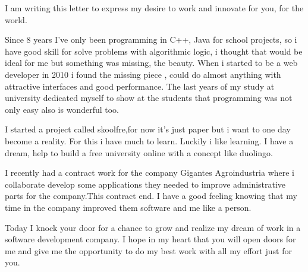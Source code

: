 \documentclass[11pt,a4paper,sans]{moderncv} %
\begin{document}
\makelettertitle %
I am writing this letter to express my desire to work and innovate for you, for the world.


Since 8 years I've only been programming in C++, Java for school projects, so i have good skill for solve problems with  algorithmic logic, i thought that would be ideal for me but something was missing, the beauty.
When i started to be a web developer in 2010 i found the missing piece , could do almost anything  with attractive interfaces and good performance. 
The last years of my study at university dedicated myself to show  at the students that programming was not only easy  also is wonderful too. 

I started a project called skoolfre,for now it's just paper but i want to one day become a reality. For this i have much to learn. Luckily i like  learning. I have a dream, help to build a free university online with  a concept like duolingo.

I recently  had a  contract work for the company Gigantes Agroindustria  where i collaborate  develop some applications they needed to improve administrative parts for the  company.This contract end. I have a good feeling knowing that my time in the company improved  them software and me like a person.

Today I knock  your door for a chance to grow and realize my dream of work in a software development company. I hope in my heart that you will open doors for me and give me the opportunity to do my best work with all my effort just for you.

\makeletterclosing %

\end{document}
